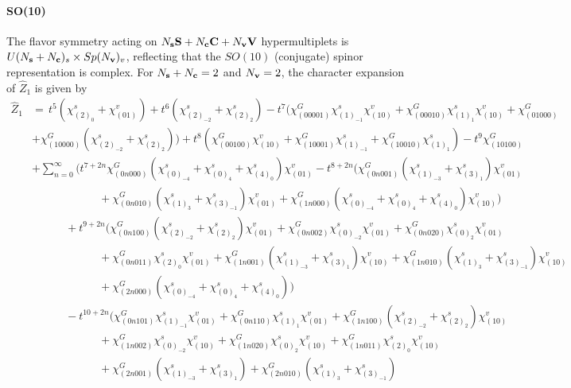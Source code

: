 \documentclass[letterpaper, 11pt]{article}
\newcommand{\nn}{\nonumber}
\begin{document}
{\paragraph{SO(10)} The flavor symmetry acting on $N_{\bf s} \mathbf{S} + N_{\bf c} \mathbf{C} + N_{\bf v} \mathbf{V}$ hypermultiplets is $U(N_{\bf s} + N_{\bf c})_s \times Sp(N_{\bf v})_v$, reflecting  that the $SO(10)$ (conjugate) spinor representation is complex. For $N_{\bf s} + N_{\bf c} = 2$ and $N_{\bf v} = 2$, the character expansion of $\hat{Z}_1$ is given by 
\begin{align}
  \label{eq:so10-2s2v}
\hat{Z}_1&=\,t^5(\chi^s_{(2)_0}+\chi^v_{(01)})+t^6(\chi^s_{(2)_{-2}}+\chi^s_{(2)_2})-t^7(\chi^G_{(00001)}\chi^s_{(1)_{-1}}\chi^v_{(10)}+\chi^G_{(00010)}\chi^s_{(1)_1}\chi^v_{(10)}+\chi^G_{(01000)}\nn\\
&+\chi^G_{(10000)}(\chi^s_{(2)_{-2}}+\chi^s_{(2)_2}))+t^8(\chi^G_{(00100)}\chi^v_{(10)}+\chi^G_{(10001)}\chi^s_{(1)_{-1}}+\chi^G_{(10010)}\chi^s_{(1)_1})-t^9\chi^G_{(10100)}\nn\\
&\textstyle+\sum_{n=0}^{\infty}\Big(t^{7+2n}\chi^G_{(0n000)}(\chi^s_{(0)_{-4}}+\chi^s_{(0)_4}+\chi^s_{(4)_0})\chi^v_{(01)} -t^{8+2n}(\chi^G_{(0n001)}(\chi^s_{(1)_{-3}}+\chi^s_{(3)_1})\chi^v_{(01)} \nn\\&\qquad\quad\qquad\quad
+\chi^G_{(0n010)}(\chi^s_{(1)_3}+\chi^s_{(3)_{-1}})\chi^v_{(01)} +\chi^G_{(1n000)}(\chi^s_{(0)_{-4}}+\chi^s_{(0)_4}+\chi^s_{(4)_0})\chi^v_{(10)})\nn\\
&\qquad\quad+t^{9+2n}(\chi^G_{(0n100)}(\chi^s_{(2)_{-2}}+\chi^s_{(2)_2})\chi^v_{(01)}+\chi^G_{(0n002)}\chi^s_{(0)_{-2}}\chi^v_{(01)}+\chi^G_{(0n020)}\chi^s_{(0)_2}\chi^v_{(01)}\nn\\
&\qquad\qquad\qquad+\chi^G_{(0n011)}\chi^s_{(2)_0}\chi^v_{(01)}+\chi^G_{(1n001)}(\chi^s_{(1)_{-3}}+\chi^s_{(3)_1})\chi^v_{(10)}+\chi^G_{(1n010)}(\chi^s_{(1)_3}+\chi^s_{(3)_{-1}})\chi^v_{(10)}\nn\\
&\qquad\qquad\qquad+\chi^G_{(2n000)}(\chi^s_{(0)_{-4}}+\chi^s_{(0)_4}+\chi^s_{(4)_0}))\nn\\
&\qquad\quad-t^{10+2n}(\chi^G_{(0n101)}\chi^s_{(1)_{-1}}\chi^v_{(01)}+\chi^G_{(0n110)}\chi^s_{(1)_1}\chi^v_{(01)}+\chi^G_{(1n100)}(\chi^s_{(2)_{-2}}+\chi^s_{(2)_2})\chi^v_{(10)}\nn\\
&\qquad\qquad\qquad+\chi^G_{(1n002)}\chi^s_{(0)_{-2}}\chi^v_{(10)}+\chi^G_{(1n020)}\chi^s_{(0)_2}\chi^v_{(10)}+\chi^G_{(1n011)}\chi^s_{(2)_0}\chi^v_{(10)}\nn\\
&\qquad\qquad\qquad+\chi^G_{(2n001)}(\chi^s_{(1)_{-3}}+\chi^s_{(3)_1})+\chi^G_{(2n010)}(\chi^s_{(1)_3}+\chi^s_{(3)_{-1}})\nn\\

\end{align}}
\end{document}
